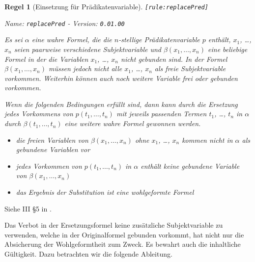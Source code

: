 \documentclass[a4paper,german,10pt,twoside]{book}
\newtheorem{rul}{Regel}
\theoremstyle{definition}
\theoremstyle{remark}
\begin{document}
\begin{rul}[Einsetzung f{\"u}r Pr{\"a}dikatenvariable]
\label{rule:replacePred} \hypertarget{rule:replacePred}{}
{\tt \tiny [\verb]rule:replacePred]]}

\par
{\em   Name: \verb]replacePred]  -  Version: \verb]0.01.00]}


Es sei $\alpha$ eine wahre Formel, die die $n$-stellige Pr{\"a}dikatenvariable $p$ enth{\"a}lt, $x_1$, \ldots, $x_n$ seien paarweise verschiedene Subjektvariable und $\beta(x_1, \ldots, x_n)$ eine beliebige Formel in der die Variablen $x_1$, \ldots, $x_n$ nicht gebunden sind. In der Formel $\beta(x_1, \ldots, x_n)$ m{\"u}ssen jedoch nicht alle $x_1$, \ldots, $x_n$ als freie Subjektvariable vorkommen. 
Weiterhin k{\"o}nnen auch noch weitere Variable frei oder gebunden vorkommen. 

Wenn die folgenden Bedingungen erf{\"u}llt sind, dann kann durch die Ersetzung jedes Vorkommens von $p(t_1, \ldots, t_n)$ mit jeweils passenden Termen $t_1$, \ldots, $t_n$ in $\alpha$ durch $\beta(t_1, \ldots, t_n)$ eine weitere wahre Formel gewonnen werden.

\begin{itemize}

\item 
die freien Variablen von $\beta(x_1, \ldots, x_n)$ ohne $x_1$, \ldots, $x_n$ kommen nicht in $\alpha$ als gebundene Variablen vor

\item
jedes Vorkommen von $p(t_1, \ldots, t_n)$ in $\alpha$ enth{\"a}lt keine gebundene Variable von $\beta(x_1, \ldots, x_n)$

\item
das Ergebnis der Substitution ist eine wohlgeformte Formel

\end{itemize}
\end{rul}

Siehe III \S 5 in \cite{hilback}.

\par
Das Verbot in der Ersetzungsformel keine zus{\"a}tzliche Subjektvariable zu verwenden, welche in der Originalformel gebunden vorkommt, hat nicht nur die Absicherung der Wohlgeformtheit zum Zweck. Es bewahrt auch die inhaltliche G{\"u}ltigkeit. Dazu betrachten wir die folgende Ableitung.
\end{document}
